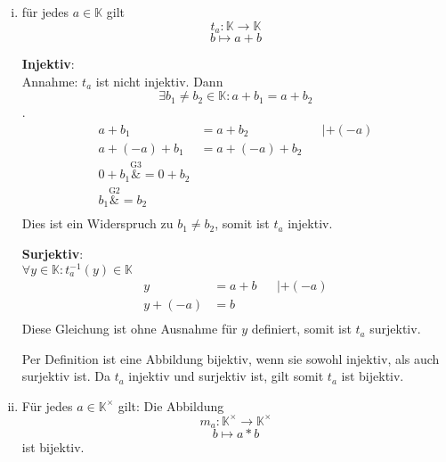 \documentclass{article}
\begin{document}
\begin{enumerate}[(i)]
\newpage
\item für jedes $a \in \mathbb{K}$ gilt
  \[
    t_a \colon \mathbb{K} \to \mathbb{K}
  \]
  \[
    b \mapsto a + b
  \]
  \begin{minipage}[t]{.4\textwidth}
    \textbf{Injektiv}: \\
    Annahme: $t_a$ ist nicht injektiv. Dann
    \[
      \exists b_1 \ne b_2 \in \mathbb{K} \colon a + b_1 = a + b_2
    \].
    \begin{align*}
      a + b_1 &= a + b_2 && | + (-a) \\
      a + (-a) + b_1 &= a + (-a) + b_2 \\
      0 + b_1 \overset{\text{G3}}&= 0 + b_2 \\
      b_1 \overset{\text{G2}}&=  b_2 \\ 
    \end{align*}
    Dies ist ein Widerspruch zu $b_1 \ne b_2$, somit ist $t_a$ injektiv.
  \end{minipage}
  \hfill
  \vrule
  \hfill
  \begin{minipage}[t]{.4\textwidth}
    \textbf{Surjektiv}: \\
    $\forall y \in \mathbb{K} \colon t_a^{-1}(y) \in \mathbb{K}$
    \begin{align*}
      y &= a + b && | + (-a) \\
      y + (-a) &= b \\
    \end{align*}
    Diese Gleichung ist ohne Ausnahme für $y$ definiert, somit ist $t_a$ surjektiv.
  \end{minipage}

  Per Definition ist eine Abbildung bijektiv, wenn sie sowohl injektiv, als auch surjektiv ist.
  Da $t_a$ injektiv und surjektiv ist, gilt somit $t_a$ ist bijektiv.

\newpage
\item Für jedes $a \in \mathbb{K}^{\times}$ gilt: Die Abbildung
  \[
    m_a \colon \mathbb{K}^{\times} \to \mathbb{K}^{\times} 
  \]
  \[
    b \mapsto a * b
  \]
  ist bijektiv.
  

\end{enumerate}
\end{document}
